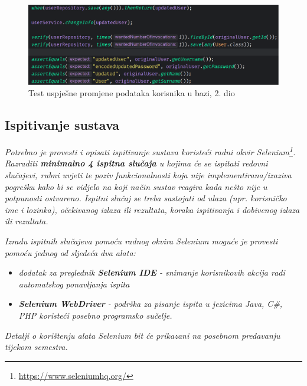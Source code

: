								\begin{figure}[H]
			\includegraphics[scale=0.4]{slike/userChangeInfoValidTest2.PNG} %
			\centering
			\caption{Test uspješne promjene podataka korisnika u bazi, 2. dio}
			\label{Test uspješne promjene podataka korisnika u bazi, 2. dio}
		\end{figure}

















			
			
			
			\subsection{Ispitivanje sustava}
			
			 \textit{Potrebno je provesti i opisati ispitivanje sustava koristeći radni okvir Selenium\footnote{\url{https://www.seleniumhq.org/}}. Razraditi \textbf{minimalno 4 ispitna slučaja} u kojima će se ispitati redovni slučajevi, rubni uvjeti te poziv funkcionalnosti koja nije implementirana/izaziva pogrešku kako bi se vidjelo na koji način sustav reagira kada nešto nije u potpunosti ostvareno. Ispitni slučaj se treba sastojati od ulaza (npr. korisničko ime i lozinka), očekivanog izlaza ili rezultata, koraka ispitivanja i dobivenog izlaza ili rezultata.\\ }
			 
			 \textit{Izradu ispitnih slučajeva pomoću radnog okvira Selenium moguće je provesti pomoću jednog od sljedeća dva alata:}
			 \begin{itemize}
			 	\item \textit{dodatak za preglednik \textbf{Selenium IDE} - snimanje korisnikovih akcija radi automatskog ponavljanja ispita	}
			 	\item \textit{\textbf{Selenium WebDriver} - podrška za pisanje ispita u jezicima Java, C\#, PHP koristeći posebno programsko sučelje.}
			 \end{itemize}
		 	\textit{Detalji o korištenju alata Selenium bit će prikazani na posebnom predavanju tijekom semestra.}
			
